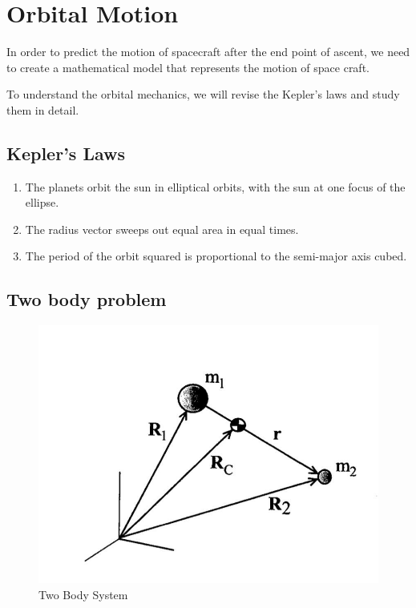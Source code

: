 \documentclass{article}
\theoremstyle{definition}
\begin{document}
\section{Orbital Motion}

In order to predict the motion of spacecraft after the end point of ascent, we need to create a mathematical model that represents the motion of space craft.

To understand the orbital mechanics, we will revise the Kepler's laws and study them in detail. 

\subsection{Kepler's Laws}
\begin{enumerate}
    \item The planets orbit the sun in elliptical orbits, with the sun at one focus of the ellipse.
    \item The radius vector sweeps out equal area in equal times.
    \item The period of the orbit squared is proportional to the semi-major axis cubed.
\end{enumerate}

\subsection{Two body problem}
\begin{figure}[h]
    \centering
    \includegraphics[scale=0.2]{image 2.jpeg}
    \caption{Two Body System}
    \label{fig:TB}
\end{figure}
\end{document}
